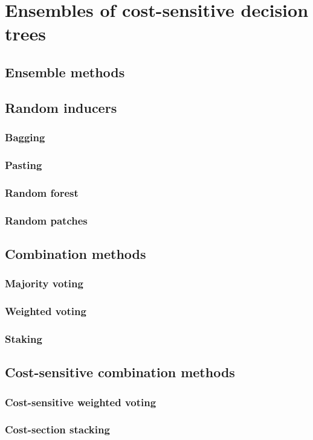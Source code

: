 \documentclass[twoside,openright,titlepage,numbers=noenddot,headinclude,%
               footinclude=true,cleardoublepage=empty,abstractoff,BCOR=5mm,%
               paper=a4,fontsize=11pt,ngerman,american,doublespace]{scrreprt}
\numberwithin{theorem}{chapter}
\numberwithin{definition}{chapter}
\numberwithin{algorithm}{chapter}
\numberwithin{figure}{chapter}
\numberwithin{table}{chapter}
\numberwithin{equation}{chapter}
\begin{document}
	\chapter{Ensembles of cost-sensitive decision trees}
		\section{Ensemble methods}
			\section{Random inducers}
				\subsection{Bagging}
				\subsection{Pasting}
				\subsection{Random forest}
				\subsection{Random patches}
			\section{Combination methods}
				\subsection{Majority voting}
				\subsection{Weighted voting}
				\subsection{Staking}
		\section{Cost-sensitive combination methods}
			\subsection{Cost-sensitive weighted voting}
			\subsection{Cost-section stacking}
\end{document}
